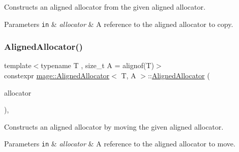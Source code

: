 Constructs an aligned allocator from the given aligned allocator.


\begin{DoxyParams}[1]{Parameters}
\mbox{\tt in}  & {\em allocator} & A reference to the aligned allocator to copy. \\
\hline
\end{DoxyParams}
\mbox{\label{classmage_1_1_aligned_allocator_ac2ef3124c1e18e07bb75006c28967c11}} 
\subsubsection{\texorpdfstring{Aligned\+Allocator()}{AlignedAllocator()}\hspace{0.1cm}{\footnotesize\ttfamily [3/4]}}
{\footnotesize\ttfamily template$<$typename T , size\+\_\+t A = alignof(\+T)$>$ \\
constexpr \mbox{\hyperlink{classmage_1_1_aligned_allocator}{mage\+::\+Aligned\+Allocator}}$<$ T, A $>$\+::\mbox{\hyperlink{classmage_1_1_aligned_allocator}{Aligned\+Allocator}} (\begin{DoxyParamCaption}\item[{\mbox{\hyperlink{classmage_1_1_aligned_allocator}{Aligned\+Allocator}}$<$ T, A $>$ \&\&}]{allocator }\end{DoxyParamCaption})\hspace{0.3cm}{\ttfamily [default]}, {\ttfamily [noexcept]}}

Constructs an aligned allocator by moving the given aligned allocator.


\begin{DoxyParams}[1]{Parameters}
\mbox{\tt in}  & {\em allocator} & A reference to the aligned allocator to move. \\
\hline
\end{DoxyParams}
\mbox{\label{classmage_1_1_aligned_allocator_a6f671f86583ecd883fa5c6ae22fd7fcb}} 
